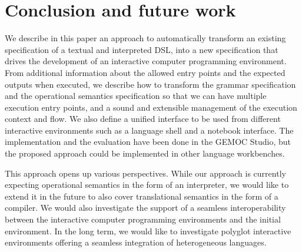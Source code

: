 \section{Conclusion and future work}
\label{sec:conclusion}

We describe in this paper an approach to automatically transform an existing specification of a textual and interpreted DSL, into a new specification that drives the development of an interactive computer programming environment. From additional information about the allowed entry points and the expected outputs when executed, we describe how to transform the grammar specification and the operational semantics specification so that we can have multiple execution entry points, and a sound and extensible management of the execution context and flow. We also define a unified interface to be used from different interactive environments such as a language shell and a notebook interface. The implementation and the evaluation have been done in the GEMOC Studio, but the proposed approach could be implemented in other language workbenches. 

This approach opens up various perspectives. While our approach is currently expecting operational semantics in the form of an interpreter, we would like to extend it in the future to also cover translational semantics in the form of a compiler. We would also investigate the support of a seamless interoperability \cite{coulon:hal-01889155} between the interactive computer programming environments and the initial environment. In the long term, we would like to investigate polyglot interactive environments offering a seamless integration of heterogeneous languages.





